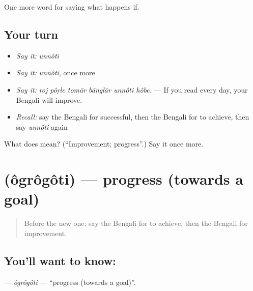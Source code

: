 \begin{grammarlens}[title={What you've built}]
One more word for saying what happens if.
\end{grammarlens}

\subsection*{Your turn}
\begin{itemize}
\raggedright
  \item \emph{Say it:} \emph{unnôti}
  \item \emph{Say it:} \emph{unnôti}, once more
  \item \emph{Say it:} \emph{roj pôṛle tomār bānglār unnôti hôbe.} — If you read every day, your Bengali will improve.
  \item \emph{Recall:} say the Bengali for successful, then the Bengali for to achieve, then say \emph{unnôti} again
\end{itemize}

\begin{tcolorbox}[breakable,colback=teal!4,colframe=teal!35!black,title={Before you move on}]
What does  mean? (\textquotedblleft{}Improvement; progress\textquotedblright{}.) Say it once more.
\end{tcolorbox}
\section[\texorpdfstring{\bn{অগ্রগতি} (ôgrôgôti)}{অগ্রগতি (ôgrôgôti)}]{ (ôgrôgôti) — progress (towards a goal)}

\label{lesson:BN-C377-ogrogoti}



\begin{quote}
Before the new one: say the Bengali for to achieve, then the Bengali for improvement.
\end{quote}

\subsection*{You'll want to know: }
\textbf{} — \emph{ôgrôgôti} — \textquotedblleft{}progress (towards a goal)\textquotedblright{}.

\begin{quote}
       
\end{quote}

